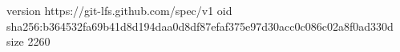 version https://git-lfs.github.com/spec/v1
oid sha256:b364532fa69b41d8d194daa0d8df87efaf375e97d30acc0c086c02a8f0ad330d
size 2260
